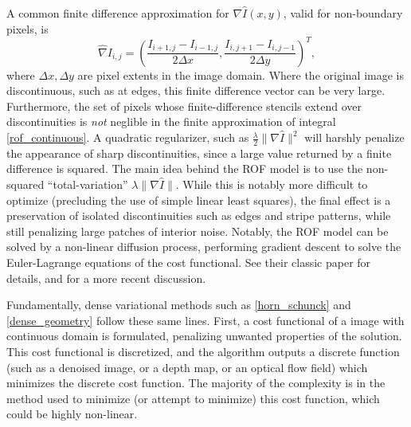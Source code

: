 \documentclass[conference]{IEEEtran}
\begin{document}
A common finite difference approximation for $\nabla\hat{I}(x,y)$, valid for non-boundary pixels, is
\begin{equation}
    \hat{\nabla}I_{i,j} = \left(\frac{I_{i+1,j} - I_{i-1,j}}{2\Delta x}, \frac{I_{i,j+1} - I_{i,j-1}}{2\Delta y}\right)^T,
\end{equation}
where $\Delta x, \Delta y$ are pixel extents in the image domain. Where the original image is discontinuous, such as at edges,
this finite difference vector can be very large. Furthermore, the set of pixels whose finite-difference stencils extend over discontinuities is
\textit{not} neglible in the finite approximation of integral \eqref{rof_continuous}. A quadratic regularizer, such as
$\frac{\lambda}{2} \|\nabla \hat{I}\|^2$ will harshly penalize the appearance of sharp discontinuities, since a large value returned
by a finite difference is squared. The main idea behind the ROF model is to use the non-squared ``total-variation'' $\lambda \|\nabla \hat{I}\|$.
While this is notably more difficult to optimize (precluding the use of simple linear least squares), the final effect is a preservation
of isolated discontinuities such as edges and stripe patterns, while still penalizing large patches of interior noise. Notably, the ROF model can be solved by a non-linear diffusion process, performing gradient descent to solve the Euler-Lagrange
equations of the cost functional. See their classic paper \cite{rof} for details, and \cite{cremers_rof} for a more recent discussion.

Fundamentally, dense variational methods such as \eqref{horn_schunck} and \eqref{dense_geometry} follow these same lines. First,
a cost functional of a image with continuous domain is formulated, penalizing unwanted properties of the solution. This cost functional is discretized,
and the algorithm outputs a discrete function (such as a denoised image, or a depth map, or an optical flow field) which minimizes the discrete cost function.
The majority of the complexity is in the method used to minimize (or attempt to minimize) this cost function, which could be highly non-linear.


\end{document}
